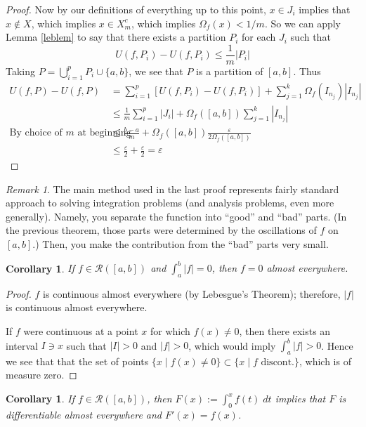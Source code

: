 \documentclass[12pt]{article}
\theoremstyle{plain}
\newtheorem{cor}[thm]{Corollary}
\theoremstyle{definition}
\theoremstyle{remark}
\newtheorem*{rmk}{Remark}
\begin{document}
\begin{proof}
Now by our definitions of everything up to this point, $x\in J_i$ implies that $x\not\in X$, which implies $x\in X^c_m$, which implies $\Omega_f(x) < 1/m$. So we can apply Lemma \ref{leblem} to say that there exists a partition $P_i$ for each $J_i$ such that 
\[ 
    U(f,P_i) - U(f,P_i) \leq \frac{1}{m}|P_i|
\]
Taking $P = \bigcup_{i=1}^p P_i \cup \{a,b\}$, we see that $P$ is a partition of $[a,b]$. Thus
\begin{align*}
    U(f,P) - U(f,P) &= \sum^p_{i=1} \left[
        U(f,P_i) - U(f,P_i)\right] + \sum^k_{j=1}
        \Omega_f(I_{n_j}) |I_{n_j}| \\
    &\leq \frac{1}{m} \sum^p_{i=1} |J_i| 
        + \Omega_f([a,b]) \sum^k_{j=1} |I_{n_j}| \\
    \text{By choice of $m$ at beginning} \quad 
        &\leq \frac{b-a}{m} + \Omega_f([a,b]) 
        \frac{\varepsilon}{2\Omega_f([a,b])} \\
    &\leq \frac{\varepsilon}{2} + \frac{\varepsilon}{2} =
        \varepsilon
\end{align*}
\end{proof}

\begin{rmk}
The main method used in the last proof represents fairly standard approach to solving integration problems (and analysis problems, even more generally).  Namely, you separate the function into ``good'' and ``bad'' parts. (In the previous theorem, those parts were determined by the oscillations of $f$ on $[a,b]$.) Then, you make the contribution from the ``bad'' parts very small.
\end{rmk}

\begin{cor}
If $f\in\mathscr{R}([a,b])$ and $\int^b_a |f| = 0$, then $f=0$ almost everywhere.
\end{cor}

\begin{proof}
$f$ is continuous almost everywhere (by Lebesgue's Theorem); therefore, $|f|$ is continuous almost everywhere. 

If $f$ were continuous at a point $x$ for which $f(x)\neq 0$, then there exists an interval $I\ni x$ such that $|I|>0$ and $|f|>0$, which would imply $\int^b_a |f| > 0$. Hence we see that that the set of points $\{x \; | \; f(x)\neq 0\} \subset \{x \; | \; f \text{ discont.}\}$, which is of measure zero.
\end{proof}

\begin{cor}
If $f\in\mathscr{R}([a,b])$, then $F(x):=\int^x_0 f(t) \; dt$ implies that $F$ is differentiable almost everywhere and $F'(x)=f(x)$.
\end{cor}
\end{document}
